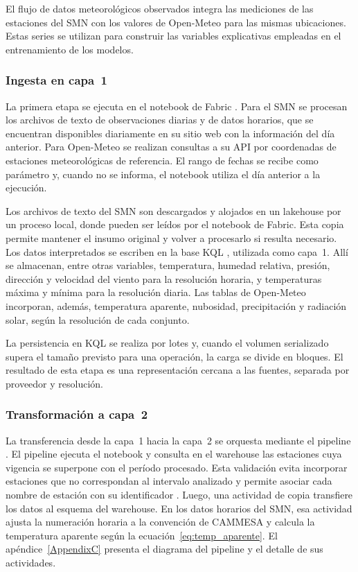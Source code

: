 El flujo de datos meteorológicos observados integra las mediciones de las estaciones del SMN con los valores de Open-Meteo para las mismas ubicaciones. Estas series se utilizan para construir las variables explicativas empleadas en el entrenamiento de los modelos.

\subsubsection{Ingesta en capa~1}

La primera etapa se ejecuta en el notebook de Fabric . Para el SMN se procesan los archivos de texto de observaciones diarias y de datos horarios, que se encuentran disponibles diariamente en su sitio web con la información del día anterior. Para Open-Meteo se realizan consultas a su API por coordenadas de estaciones meteorológicas de referencia. El rango de fechas se recibe como parámetro y, cuando no se informa, el notebook utiliza el día anterior a la ejecución.

Los archivos de texto del SMN son descargados y alojados en un lakehouse por un proceso local, donde pueden ser leídos por el notebook de Fabric. Esta copia permite mantener el insumo original y volver a procesarlo si resulta necesario. Los datos interpretados se escriben en la base KQL , utilizada como capa~1. Allí se almacenan, entre otras variables, temperatura, humedad relativa, presión, dirección y velocidad del viento para la resolución horaria, y temperaturas máxima y mínima para la resolución diaria. Las tablas de Open-Meteo incorporan, además, temperatura aparente, nubosidad, precipitación y radiación solar, según la resolución de cada conjunto.

La persistencia en KQL se realiza por lotes y, cuando el volumen serializado supera el tamaño previsto para una operación, la carga se divide en bloques. El resultado de esta etapa es una representación cercana a las fuentes, separada por proveedor y resolución.

\subsubsection{Transformación a capa~2}

La transferencia desde la capa~1 hacia la capa~2 se orquesta mediante el pipeline . El pipeline ejecuta el notebook y consulta en el warehouse las estaciones cuya vigencia se superpone con el período procesado. Esta validación evita incorporar estaciones que no correspondan al intervalo analizado y permite asociar cada nombre de estación con su identificador . Luego, una actividad de copia transfiere los datos al esquema  del warehouse. En los datos horarios del SMN, esa actividad ajusta la numeración horaria a la convención de CAMMESA y calcula la temperatura aparente según la ecuación~\ref{eq:temp_aparente}. El apéndice~\ref{AppendixC} presenta el diagrama del pipeline y el detalle de sus actividades.

